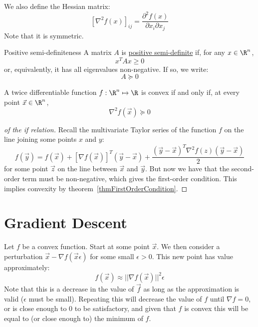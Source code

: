 \documentclass[../Main.tex]{subfiles}
\begin{document}
We also define the Hessian matrix:
\begin{equation}
    \left[\nabla^2 f(x)\right]_{ij} = \frac{\partial^2 f(x)}{\partial x_i \partial x_j}
    \label{eqnHessian}
\end{equation}
Note that it is symmetric.
\begin{definition}{Positive semi-definiteness}
    A matrix $A$ is \underline{positive semi-definite} if, for any $x \in \R^n$,
    \begin{equation}
        x^T A x \geq 0
        \label{eqnPositiveSemiDefinite}
    \end{equation}
    or, equivalently, it has all eigenvalues non-negative. If so, we write:
    \begin{equation*}
        A \succeq 0 
    \end{equation*}
\end{definition}
\begin{theorem}
    A twice differentiable function $f : \R^n \mapsto \R$ is convex if and only if, at every point $\vec{x} \in \R^n$,
    \begin{equation}
        \nabla^2 f(\vec{x}) \succeq 0
        \label{eqnSecondOrderCondition}
    \end{equation}
    \label{thmSecondOrderCondition}
\end{theorem}
\begin{proof}[of the if relation]
    Recall the multivariate Taylor series of the function $f$ on the line joining some points $x$ and $y$:
    \begin{equation*}
        f(\vec{y}) = f(\vec{x}) + [\nabla f(\vec{x})]^T (\vec{y} - \vec{x}) + \frac{(\vec{y} - \vec{x})^T \nabla^2 f(z) (\vec{y}-\vec{x})}{2}
    \end{equation*}
    for some point $\vec{z}$ on the line between $\vec{x}$ and $\vec{y}$. But now we have that the second-order term must be non-negative, which gives the first-order condition. This implies convexity by theorem~\ref{thmFirstOrderCondition}.
\end{proof}
\section{Gradient Descent}
Let $f$ be a convex function. Start at some point $\vec{x}$. We then consider a perturbation $\vec{x} - \nabla f(\vec{x} \epsilon)$ for some small $\epsilon > 0$. This new point has value approximately:
\begin{equation*}
    f(\vec{x}) \approx ||\nabla f(\vec{x})||^2 \epsilon
\end{equation*}
Note that this is a decrease in the value of $\vec{f}$ as long as the approximation is valid ($\epsilon$ must be small). Repeating this will decrease the value of $f$ until $\nabla f = 0$, or is close enough to $0$ to be satisfactory, and given that $f$ is convex this will be equal to (or close enough to) the minimum of $f$.
\end{document}
